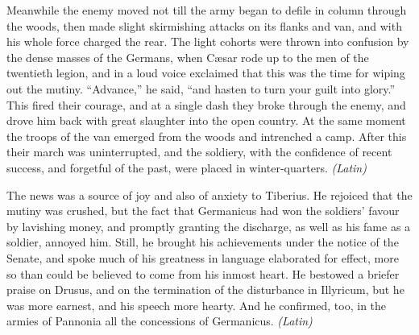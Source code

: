 Meanwhile the enemy moved not till the army began to defile in column through the woods, then made slight skirmishing attacks on its flanks and van, and with his whole force charged the rear. The light cohorts were thrown into confusion by the dense masses of the Germans, when Cæsar rode up to the men of the twentieth legion, and in a loud voice exclaimed that this was the time for wiping out the mutiny. ``Advance,'' he said, ``and hasten to turn your guilt into glory.'' This fired their courage, and at a single dash they broke through the enemy, and drove him back with great slaughter into the open country. At the same moment the troops of the van emerged from the woods and intrenched a camp. After this their march was uninterrupted, and the soldiery, with the confidence of recent success, and forgetful of the past, were placed in winter-quarters. \emph{(Latin)}


The news was a source of joy and also of anxiety to Tiberius. He rejoiced that the mutiny was crushed, but the fact that Germanicus had won the soldiers' favour by lavishing money, and promptly granting the discharge, as well as his fame as a soldier, annoyed him. Still, he brought his achievements under the notice of the Senate, and spoke much of his greatness in language elaborated for effect, more so than could be believed to come from his inmost heart. He bestowed a briefer praise on Drusus, and on the termination of the disturbance in Illyricum, but he was more earnest, and his speech more hearty. And he confirmed, too, in the armies of Pannonia all the concessions of Germanicus. \emph{(Latin)}


